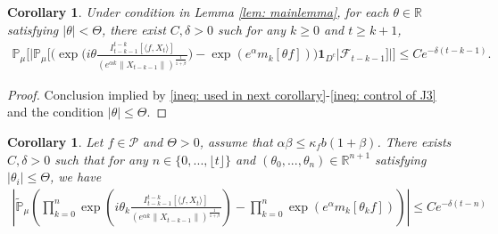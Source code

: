 \documentclass[12pt,oneside,english]{amsart}
\theoremstyle{plain}
\newtheorem{cor}[thm]{Corollary}
\theoremstyle{definition}
\numberwithin{equation}{section}
\begin{document}
\begin{cor}\label{cor: used in next corollary}
Under condition in Lemma \ref{lem: mainlemma}, for each $\theta\in \mathbb{R}$ satisfying $|\theta|<\Theta$, there exist $C,\delta>0$ such for any $k\geq0$ and $t\geq k+1$,
\begin{align}
    \mathbb{P}_{\mu}\Big[\Big|\mathbb{P}_{\mu}\big[\big(\exp{(i\theta\frac{I_{t-k-1}^{t-k}[\langle f ,X_t\rangle]}{(e^{\alpha k}\|X_{t-k-1}\|)^{\frac{1}{1+\beta}}}})-\exp(e^{\alpha}m_k[\theta f])\big)\mathbf{1}_{D^c}\big|\mathscr{F}_{t-k-1}\big]\Big|\Big]\leq Ce^{-\delta(t-k-1)}.
\end{align}
\end{cor}
\begin{proof}
    Conclusion implied by  \eqref{ineq: used in next corollary}-\eqref{ineq: control of J3} and the condition $|\theta|\leq \Theta$.
\end{proof}
\begin{cor}\label{corollary31}
Let $f\in \mathcal{P}$ and $\Theta>0$, assume that $\alpha\beta\leq\kappa_fb(1+\beta)$. There exists $C,\delta>0$ such that for any $n \in \{0,...,\lfloor t \rfloor\}$ and $(\theta_0,...,\theta_n)\in \mathbb{R}^{n+1}$ satisfying $|\theta_i|\leq \Theta$, we have
\begin{align}
\label{32corollary}
    \left|\mathbb{\tilde{P}}_{\mu}\left(\prod_{k=0}^n\exp(i\theta_k \frac {I_{t-k-1}^{t-k}[\langle f ,X_t\rangle]}{(e^{\alpha k}\|X_{t-k-1}\|)^\frac{1}{1+\beta}})-\prod_{k=0}^n\exp(e^{\alpha}m_k[\theta_k f])\right)\right|\leq C e^{-\delta(t-n)}
\end{align}
\end{cor}
\end{document}
